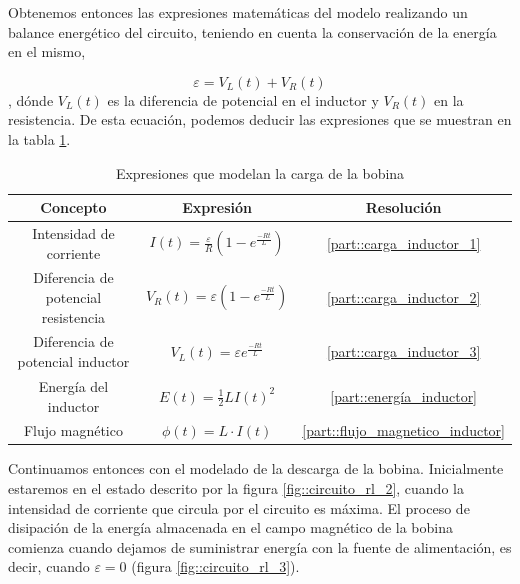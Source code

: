 \documentclass[../main.tex]{subfiles}
\begin{document}
Obtenemos entonces las expresiones matemáticas del modelo realizando un balance energético del circuito, teniendo en cuenta la conservación de la energía en el mismo,

\begin{equation}
    \label{eqq::carga_bobina}
    \varepsilon = V_L(t) + V_R(t)
\end{equation}
, dónde $V_L(t)$ es la diferencia de potencial en el inductor y $V_R(t)$ en la resistencia. De esta ecuación, podemos deducir las expresiones que se muestran en la tabla \ref{tab::ecuaciones_carga_rl}.\\

\begin{table}[!ht]
        \begin{center}
            \begin{tabular}{|| c | c | c ||}
                \hline
                \textbf{Concepto} & \textbf{Expresión} &  \textbf{Resolución}\\ \hline
                Intensidad de corriente & $I(t) = \frac{\varepsilon}{R} \left( 1 - e^{\frac{-Rt}{L}}\right)$ & \ref{part::carga_inductor_1}\\
                Diferencia de potencial resistencia & $V_R(t) = \varepsilon \left( 1 - e^{\frac{-Rt}{L}}\right)$ & \ref{part::carga_inductor_2} \\ 
                Diferencia de potencial inductor & $V_L(t) = \varepsilon   e^{\frac{-Rt}{L}}$ & \ref{part::carga_inductor_3} \\ 
                Energía del inductor & $E(t) = \frac{1}{2}LI(t)^2 $ & \ref{part::energía_inductor} \\
                Flujo magnético & $\phi (t) = L \cdot I(t)$ & \ref{part::flujo_magnetico_inductor} \\
                \hline
                \end{tabular}
                \caption{Expresiones que modelan la carga de la bobina}
                \label{tab::ecuaciones_carga_rl}
        \end{center}
    \end{table}
    
Continuamos entonces con el modelado de la descarga de la bobina. Inicialmente estaremos en el estado descrito por la figura \ref{fig::circuito_rl_2}, cuando la intensidad de corriente que circula por el circuito es máxima. El proceso de disipación de la energía almacenada en el campo magnético de la bobina comienza cuando dejamos de suministrar energía con la fuente de alimentación, es decir, cuando $\varepsilon = 0$ (figura \ref{fig::circuito_rl_3}). \\
    
\end{document}
